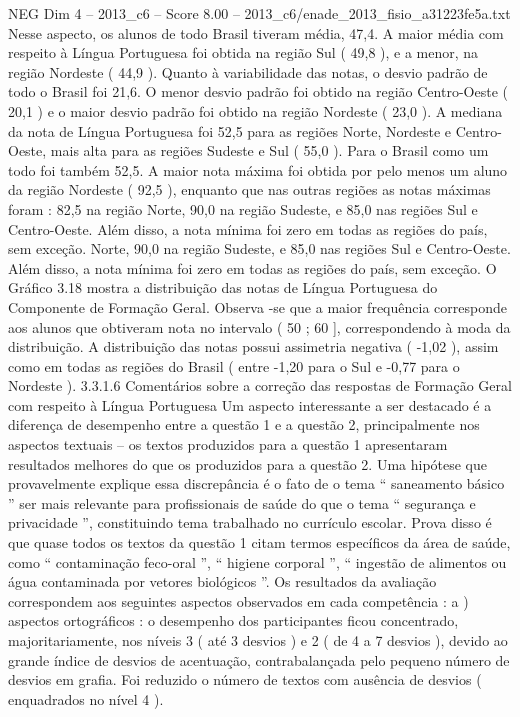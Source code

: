 \begin{textsample}{NEG Dim 4 – 2013\_c6 – Score 8.00 – 2013\_c6/enade\_2013\_fisio\_a31223fe5a.txt}
Nesse aspecto, os alunos de todo Brasil tiveram média, 47,4.
A maior média com respeito à Língua Portuguesa foi obtida na região Sul ( 49,8 ), e a menor, na região Nordeste ( 44,9 ).
Quanto à variabilidade das notas, o desvio padrão de todo o Brasil foi 21,6.
O menor desvio padrão foi obtido na região Centro-Oeste ( 20,1 ) e o maior desvio padrão foi obtido na região Nordeste ( 23,0 ).
A mediana da nota de Língua Portuguesa foi 52,5 para as regiões Norte, Nordeste e Centro-Oeste, mais alta para as regiões Sudeste e Sul ( 55,0 ).
Para o Brasil como um todo foi também 52,5.
A maior nota máxima foi obtida por pelo menos um aluno da região Nordeste ( 92,5 ), enquanto que nas outras regiões as notas máximas foram : 82,5 na região Norte, 90,0 na região Sudeste, e 85,0 nas regiões Sul e Centro-Oeste.
Além disso, a nota mínima foi zero em todas as regiões do país, sem exceção.
Norte, 90,0 na região Sudeste, e 85,0 nas regiões Sul e Centro-Oeste.
Além disso, a nota mínima foi zero em todas as regiões do país, sem exceção.
O Gráfico 3.18 mostra a distribuição das notas de Língua Portuguesa do Componente de Formação Geral.
Observa -se que a maior frequência corresponde aos alunos que obtiveram nota no intervalo ( 50 ; 60 ], correspondendo à moda da distribuição.
A distribuição das notas possui assimetria negativa ( -1,02 ), assim como em todas as regiões do Brasil ( entre -1,20 para o Sul e -0,77 para o Nordeste ). 3.3.1.6 Comentários sobre a correção das respostas de Formação Geral com respeito à Língua Portuguesa Um aspecto interessante a ser destacado é a diferença de desempenho entre a questão 1 e a questão 2, principalmente nos aspectos textuais – os textos produzidos para a questão 1 apresentaram resultados melhores do que os produzidos para a questão 2.
Uma hipótese que provavelmente explique essa discrepância é o fato de o tema “ saneamento básico ” ser mais relevante para profissionais de saúde do que o tema “ segurança e privacidade ”, constituindo tema trabalhado no currículo escolar.
Prova disso é que quase todos os textos da questão 1 citam termos específicos da área de saúde, como “ contaminação feco-oral ”, “ higiene corporal ”, “ ingestão de alimentos ou água contaminada por vetores biológicos ”.
Os resultados da avaliação correspondem aos seguintes aspectos observados em cada competência : a ) aspectos ortográficos : o desempenho dos participantes ficou concentrado, majoritariamente, nos níveis 3 ( até 3 desvios ) e 2 ( de 4 a 7 desvios ), devido ao grande índice de desvios de acentuação, contrabalançada pelo pequeno número de desvios em grafia.
Foi reduzido o número de textos com ausência de desvios ( enquadrados no nível 4 ).

\end{textsample}
